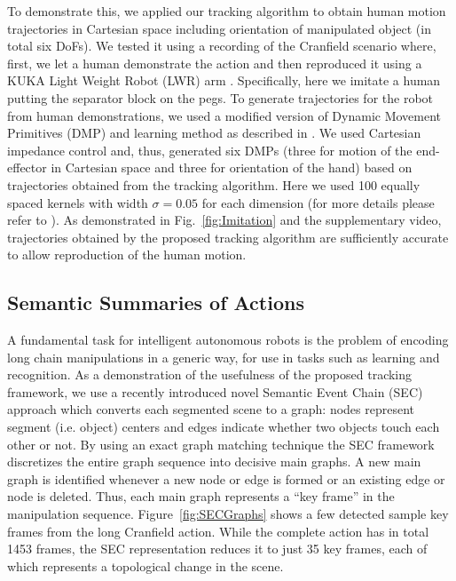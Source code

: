 To demonstrate this, we applied our tracking algorithm to obtain human motion trajectories in Cartesian space including orientation of manipulated object (in total six DoFs). We tested it using a recording of the Cranfield scenario where, first, we let a human demonstrate the action and then reproduced it using a KUKA Light Weight Robot (LWR) arm \cite{kuka}. Specifically, here we imitate a human putting the separator block on the pegs. To generate trajectories for the robot from human demonstrations, we used a modified version of Dynamic Movement Primitives \cite{Ijspeert2002,Ijspeert2013} (DMP) and learning method as described in \cite{Kulvicius2012}. We used Cartesian impedance control and, thus, generated six DMPs (three for motion of the end-effector in Cartesian space and three for orientation of the hand) based on trajectories obtained from the tracking algorithm. Here we used 100 equally spaced kernels with width $\sigma=0.05$ for each dimension (for more details please refer to \cite{Kulvicius2012}).
 As demonstrated in Fig.~\ref{fig:Imitation} and the supplementary video, trajectories obtained by the proposed tracking algorithm are sufficiently accurate to allow reproduction of the human motion.


\subsection{Semantic Summaries of Actions}

A fundamental task for intelligent autonomous robots is the problem of encoding long chain manipulations in a generic way, for use in tasks such as learning and recognition. As a demonstration of the usefulness of the proposed tracking framework, we use a recently introduced novel Semantic Event Chain (SEC) approach \cite{Aksoy11} which converts each segmented scene to a graph: nodes represent segment (i.e. object) centers and edges indicate whether two objects touch each other or not. By using an exact graph matching technique the SEC framework discretizes the entire graph sequence into decisive main graphs. A new main graph is identified whenever a new node or edge is formed or an existing edge or node is deleted. Thus, each main graph represents a “key frame” in the manipulation sequence. Figure~\ref{fig:SECGraphs} shows a few detected sample key frames from the long Cranfield action. While the complete action has in total 1453 frames, the SEC representation reduces it to just 35 key frames, each of which represents a topological change in the scene.


